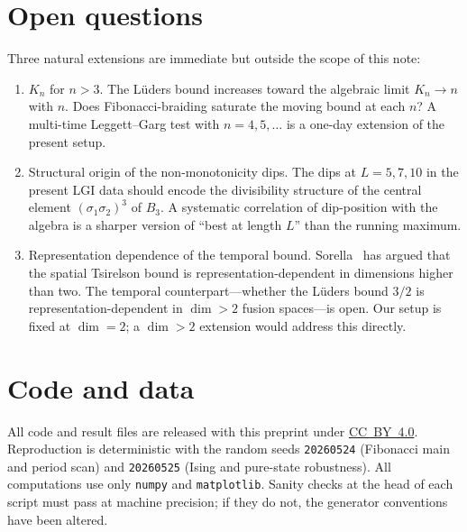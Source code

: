\documentclass[aps,prx,reprint,amsmath,amssymb,floatfix,nofootinbib,superscriptaddress]{revtex4-2}
\begin{document}
\section{Open questions}
\label{sec:open}

Three natural extensions are immediate but outside the scope of this
note:
\begin{enumerate}
\item[\textbf{O1.}] $K_{n}$ for $n > 3$. The L\"uders bound increases
toward the algebraic limit $K_{n} \to n$ with $n$. Does
Fibonacci-braiding saturate the moving bound at each $n$? A
multi-time Leggett--Garg test with $n=4,5,\ldots$ is a one-day
extension of the present setup.
\item[\textbf{O2.}] Structural origin of the non-monotonicity dips.
The dips at $L = 5, 7, 10$ in the present LGI data should encode the
divisibility structure of the central element $(\sigma_{1}\sigma_{2})^{3}$
of $B_{3}$. A systematic correlation of dip-position with the algebra
is a sharper version of ``best at length $L$'' than the running
maximum.
\item[\textbf{O3.}] Representation dependence of the temporal bound.
Sorella~\cite{Sorella2023} has argued that the spatial Tsirelson
bound is representation-dependent in dimensions higher than two. The
temporal counterpart---whether the L\"uders bound $3/2$ is
representation-dependent in $\dim > 2$ fusion spaces---is open. Our
setup is fixed at $\dim = 2$; a $\dim > 2$ extension would address
this directly.
\end{enumerate}

\section{Code and data}

All code and result files are released with this preprint under
\href{https://creativecommons.org/licenses/by/4.0/}{CC~BY~4.0}.
Reproduction is deterministic with the random seeds
\texttt{20260524} (Fibonacci main and period scan) and
\texttt{20260525} (Ising and pure-state robustness). All
computations use only \texttt{numpy} and \texttt{matplotlib}.
Sanity checks at the head of each script must pass at machine
precision; if they do not, the generator conventions have been
altered.
\end{document}
